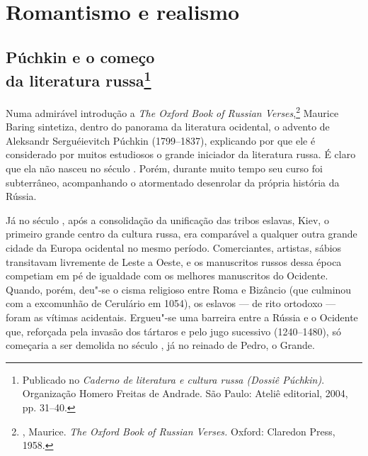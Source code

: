 
\part{Romantismo e realismo}

\chapter{Púchkin e o começo\\ da literatura russa\footnote{Publicado no \emph{Caderno de literatura e cultura russa (Dossiê Púchkin)}. Organização Homero Freitas de Andrade. São Paulo: Ateliê editorial, 2004, pp. 31--40.}}
\label{puchkin1}

Numa admirável introdução a \emph{The Oxford Book of Russian Verses},\footnote{, Maurice. \emph{The Oxford Book of Russian Verses.} Oxford: Claredon Press, 1958.}
Maurice Baring sintetiza, dentro do panorama da literatura ocidental, o
advento de Aleksandr Serguéievitch Púchkin (1799--1837), explicando por
que ele é considerado por muitos estudiosos o grande iniciador da
literatura russa. É claro que ela não nasceu no século . Porém, durante muito tempo seu curso foi subterrâneo, acompanhando o atormentado
desenrolar da própria história da Rússia.

Já no século , após a consolidação da unificação das tribos eslavas,
Kiev, o primeiro grande centro da cultura russa, era comparável a
qualquer outra grande cidade da Europa ocidental no mesmo período.
Comerciantes, artistas, sábios transitavam livremente de Leste a Oeste,
e os manuscritos russos dessa época competiam em pé de igualdade com os
melhores manuscritos do Ocidente. Quando, porém, deu"-se o cisma
religioso entre Roma e Bizâncio (que culmi­nou com a excomunhão de
Cerulário em 1054), os eslavos --- de rito ortodoxo --- foram as vítimas
acidentais. Ergueu"-se uma barreira entre a Rússia e o Ociden­te que,
reforçada pela invasão dos tártaros e pelo jugo sucessivo (1240--1480),
só começaria a ser demolida no século , já no reinado de
Pedro, o Grande.

